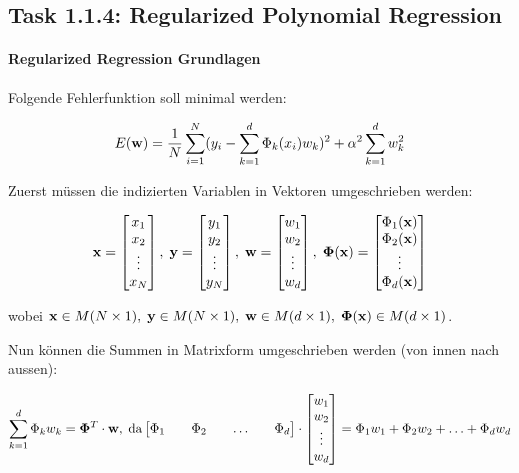 \subsection{Task 1.1.4: Regularized Polynomial Regression}


\paragraph{Regularized Regression Grundlagen}

Folgende Fehlerfunktion soll minimal werden:

$$ E(\mathbf{w}) = \frac{1}{N} \sum_{i=1}^N(y_i - \sum_{k=1}^d \Phi_k(x_i) w_k)^2 + \alpha^2 \sum_{k=1}^d w_k^2 $$

Zuerst müssen die indizierten Variablen in Vektoren umgeschrieben werden:

$$ \mathbf{x} = \begin{bmatrix} x_1 \\ x_2 \\ \vdots \\ x_N \end{bmatrix}, \; \mathbf{y} = \begin{bmatrix} y_1 \\ y_2 \\ \vdots \\ y_N \end{bmatrix}, \; \mathbf{w} = \begin{bmatrix} w_1 \\ w_2 \\ \vdots \\ w_d \end{bmatrix}, \; \mathbf{\Phi}(\mathbf{x}) = \begin{bmatrix} \Phi_1(\mathbf{x}) \\ \Phi_2(\mathbf{x}) \\ \vdots \\ \Phi_d(\mathbf{x}) \end{bmatrix} $$

wobei $ \mathbf{x} \in M(N \times 1), \; \mathbf{y} \in M(N \times 1), \; \mathbf{w} \in M(d \times 1), \; \mathbf{\Phi}(\mathbf{x}) \in M(d \times 1) $.

Nun können die Summen in Matrixform umgeschrieben werden (von innen nach aussen):

$$ \sum_{k=1}^d \Phi_k w_k = \mathbf{\Phi}^T \cdot \mathbf{w}, \; \text{da} \begin{bmatrix} \Phi_1 && \Phi_2 && \hdots && \Phi_d \end{bmatrix} \cdot \begin{bmatrix} w_1 \\ w_2 \\ \vdots \\ w_d \end{bmatrix} = \Phi_1 w_1 + \Phi_2 w_2 + \hdots + \Phi_d w_d $$


